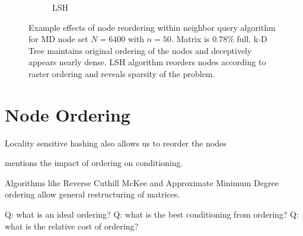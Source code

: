 \begin{figure}
\begin{subfigure}{0.425\textwidth}
\caption{LSH}
\end{subfigure}
\caption{Example effects of node reordering within neighbor query algorithm for MD node set $N=6400$ with $n=50$. Matrix is $0.78\%$ full. k-D Tree maintains original ordering of the nodes and deceptively appears nearly dense. LSH algorithm reorders nodes according to raster ordering and reveals sparsity of the problem.  }
\end{figure} 

\section{Node Ordering}

Locality sensitive hashing also allows us to reorder the nodes

\cite{Saad2003} mentions the impact of ordering on conditioning.

Algorithms like Reverse Cuthill McKee and Approximate Minimum Degree ordering allow general restructuring of matrices. 


Q: what is an ideal ordering?
Q: what is the best conditioning from ordering?
Q: what is the relative cost of ordering?


